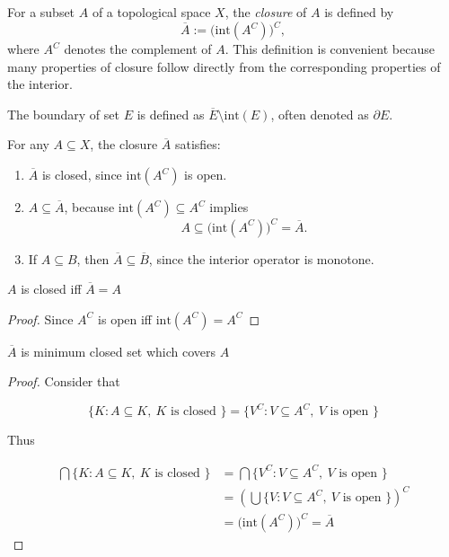\begin{definition}[Closure]
    For a subset $A$ of a topological space $X$, the \emph{closure} of $A$ is defined by
    \[
        \overline{A} := \bigl(\mathrm{int}(A^C)\bigr)^C,
    \]
    where $A^C$ denotes the complement of $A$. This definition is convenient because
    many properties of closure follow directly from the corresponding properties of the interior.
\end{definition}

\begin{definition}[Boundary]
    The boundary of set $E$ is defined as $\overline{E} \setminus \mathrm{int}(E)$,
    often denoted as $\partial E$. 
\end{definition}

\begin{thm}
    For any $A\subseteq X$, the closure $\overline{A}$ satisfies:
    \begin{enumerate}
        \item $\overline{A}$ is closed, since $\mathrm{int}(A^C)$ is open.
        \item $A \subseteq \overline{A}$, because $\mathrm{int}(A^C)\subseteq A^C$ implies
        \[
            A \subseteq \bigl(\mathrm{int}(A^C)\bigr)^C = \overline{A}.
        \]
        \item If $A\subseteq B$, then $\overline{A}\subseteq \overline{B}$, since the interior operator is monotone.
    \end{enumerate}
\end{thm}


\begin{thm}
    $A$ is closed iff $\overline{A} = A$
\end{thm}

\begin{proof}
    Since $A^C$ is open iff $\mathrm{int}(A^C) = A^C$
\end{proof}

\begin{thm}
    $\overline{A}$ is minimum closed set which covers $A$
\end{thm}

\begin{proof}
    Consider that

    \[
        \{ K:  A \subseteq K,\: K \text{ is closed }\} = \{ V^C: V \subseteq A^C,\: V \text{ is open }\}
    \]

    Thus

    \begin{align*}
        \bigcap \{ K:  A \subseteq K,\: K \text{ is closed }\} &= \bigcap \{ V^C: V \subseteq A^C,\: V \text{ is open }\} \\
        &=  \left( \bigcup \{ V: V \subseteq A^C,\: V \text{ is open }\} \right)^C \\
        &= \bigl( \mathrm{int}(A^C) \bigr)^C = \overline{A}
    \end{align*}
\end{proof}

